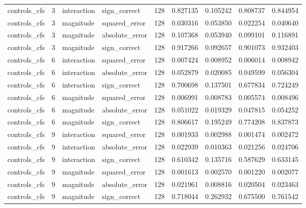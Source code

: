 \begin{tabular}{lrllrrrrr}
controls_cfs & 3 & interaction & sign_correct & 128 & 0.827135 & 0.105242 & 0.808737 & 0.844954 \\
controls_cfs & 3 & magnitude & squared_error & 128 & 0.030316 & 0.053850 & 0.022254 & 0.040640 \\
controls_cfs & 3 & magnitude & absolute_error & 128 & 0.107368 & 0.053940 & 0.099101 & 0.116891 \\
controls_cfs & 3 & magnitude & sign_correct & 128 & 0.917266 & 0.092657 & 0.901073 & 0.932403 \\
controls_cfs & 6 & interaction & squared_error & 128 & 0.007424 & 0.008952 & 0.006014 & 0.008942 \\
controls_cfs & 6 & interaction & absolute_error & 128 & 0.052879 & 0.020085 & 0.049599 & 0.056304 \\
controls_cfs & 6 & interaction & sign_correct & 128 & 0.700698 & 0.137501 & 0.677834 & 0.724249 \\
controls_cfs & 6 & magnitude & squared_error & 128 & 0.006991 & 0.008783 & 0.005574 & 0.008496 \\
controls_cfs & 6 & magnitude & absolute_error & 128 & 0.051022 & 0.019329 & 0.047815 & 0.054252 \\
controls_cfs & 6 & magnitude & sign_correct & 128 & 0.806617 & 0.195249 & 0.774208 & 0.837873 \\
controls_cfs & 9 & interaction & squared_error & 128 & 0.001933 & 0.002988 & 0.001474 & 0.002472 \\
controls_cfs & 9 & interaction & absolute_error & 128 & 0.022939 & 0.010363 & 0.021256 & 0.024706 \\
controls_cfs & 9 & interaction & sign_correct & 128 & 0.610342 & 0.135716 & 0.587629 & 0.633145 \\
controls_cfs & 9 & magnitude & squared_error & 128 & 0.001613 & 0.002570 & 0.001220 & 0.002077 \\
controls_cfs & 9 & magnitude & absolute_error & 128 & 0.021961 & 0.008816 & 0.020504 & 0.023463 \\
controls_cfs & 9 & magnitude & sign_correct & 128 & 0.718044 & 0.262932 & 0.675500 & 0.761542 \\
\bottomrule
\end{tabular}
